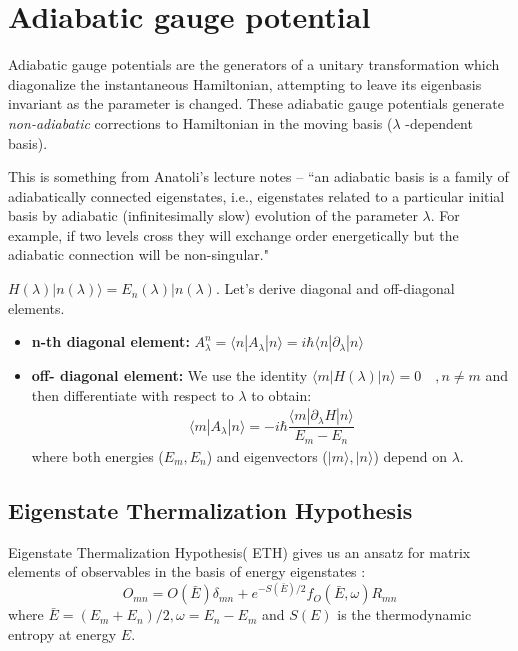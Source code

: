 \documentclass[11pt,a4paper]{article}
\begin{document}
\section{Adiabatic gauge potential}
Adiabatic gauge potentials are the generators of a unitary transformation which diagonalize the instantaneous Hamiltonian, attempting to leave its eigenbasis invariant as the parameter is changed. These adiabatic gauge potentials generate \textit{non-adiabatic} corrections to Hamiltonian in the moving basis ($\lambda$ -dependent basis).
 
 This is something from Anatoli's lecture notes \cite{kolodrubetz2016geometry}--
``an adiabatic basis is a family of adiabatically connected eigenstates, i.e., eigenstates related
to a particular initial basis by adiabatic (infinitesimally slow) evolution of the parameter $\lambda$. For example, if two levels cross they will exchange order energetically but the adiabatic connection will be non-singular."


$H (\lambda) |n(\lambda) \rangle = E_n (\lambda) |n(\lambda) $. Let's derive diagonal and off-diagonal elements. 

\begin{itemize}
\item \textbf{n-th diagonal element:} $A_{\lambda}^n= \langle n |A_{\lambda} | n \rangle=  i \hbar\langle n |\partial_{\lambda} | n \rangle $
\item \textbf{off- diagonal element:} We use the identity $\langle m |H(\lambda) | n \rangle=0 \quad, n \neq m$ and then differentiate with respect to $\lambda$ to obtain:
\begin{align}
\boxed{\langle m |A_{\lambda} | n \rangle =  -i \hbar \dfrac{\langle m |\partial_{\lambda}H | n \rangle}{E_m-E_n}}
\end{align}
where both  energies ($E_m, E_n$) and eigenvectors ($|m \rangle, |n \rangle$) depend on $\lambda$.
\end{itemize}







\subsection{Eigenstate Thermalization Hypothesis}
Eigenstate Thermalization Hypothesis( ETH) gives us an ansatz for matrix elements of observables in the basis of energy eigenstates  \cite{d2016quantum}:
\begin{equation}
O_{mn}= O( \bar{E}) \delta_{mn} + e^{-S(\bar{E})/2} f_O(\bar{E}, \omega) R_{mn}
\end{equation}
where $\bar{E}= (E_m +E_n)/2, \omega= E_n- E_m$ and $S(E)$ is the thermodynamic entropy at energy $E$.
\end{document}

